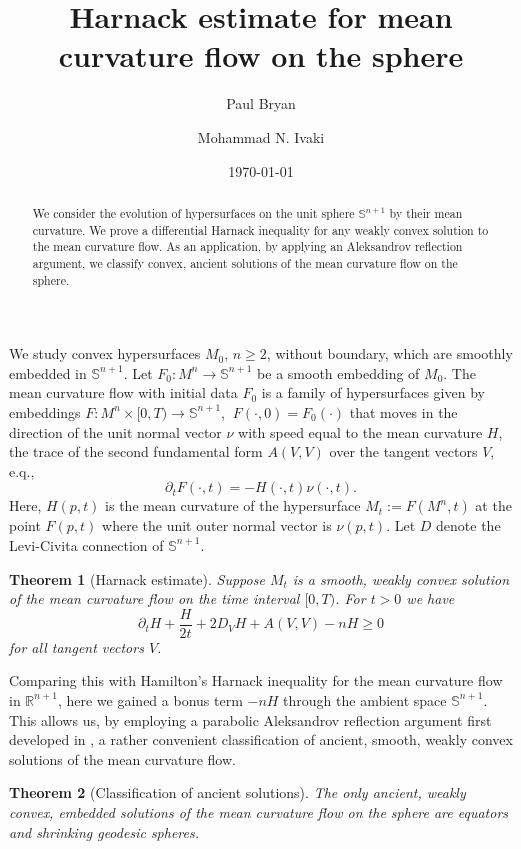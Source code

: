 \documentclass{amsart}
\newtheorem*{thmmain}{Theorem}
\theoremstyle{definition}
\theoremstyle{remark}
\numberwithin{equation}{section}
\begin{document}
\title[Harnack estimate for mean curvature flow on the sphere]
{Harnack estimate for mean curvature flow on the sphere}
\author[P. Bryan]{Paul Bryan}
\address{Department of Mathematics, University of California San Diego, La Jolla, USA}
\curraddr{}
\author[M.N. Ivaki]{Mohammad N. Ivaki}
\address{Institut f\"{u}r Diskrete Mathematik und Geometrie, Technische Universit\"{a}t Wien,
Wiedner Hauptstr. 8--10, 1040 Wien, Austria}
\curraddr{}
\date{\today}

\begin{abstract}
We consider the evolution of hypersurfaces on the unit sphere $\mathbb{S}^{n+1}$ by their mean curvature. We prove a differential Harnack inequality for any weakly convex solution to the mean curvature flow. As an application, by applying an Aleksandrov reflection argument, we classify convex, ancient solutions of the mean curvature flow on the sphere.
\end{abstract}
\maketitle
We study convex hypersurfaces $M_0$, $n\ge2$, without boundary, which are smoothly embedded in $\mathbb{S}^{n+1}.$ Let $F_0:M^n\to \mathbb{S}^{n+1}$ be a smooth embedding of $M_0$. The mean curvature flow with initial data $F_0$ is a family of hypersurfaces given by embeddings $F:M^n\times[0,T)\to \mathbb{S}^{n+1}$, $~ F(\cdot,0)=F_0(\cdot)$ that moves in the direction of the unit normal vector $\nu$ with speed equal to the mean curvature $H$, the trace of the second fundamental form $A(V,V)$ over the tangent vectors $V$, e.q.,
\[\partial_tF(\cdot,t)=-H(\cdot,t)\nu(\cdot,t).\]
Here, $H(p,t)$ is the mean curvature of the hypersurface $M_t:=F(M^n,t)$ at the point $F(p,t)$ where the unit outer normal vector is $\nu(p,t).$
Let $D$ denote the Levi-Civita connection of $\mathbb{S}^{n+1}.$
\begin{thmmain}[Harnack estimate]
Suppose $M_t$ is a smooth, weakly convex solution of the mean curvature flow on the time interval $[0,T)$. For $t>0$ we have
\[\partial_tH+\frac{H}{2t}+2D_VH+A(V,V)-nH\geq 0\]
for all tangent vectors $V$.
\end{thmmain}
Comparing this with Hamilton's Harnack inequality \cite{Hamilton 95} for the mean curvature flow in $\mathbb{R}^{n+1}$, here we gained a bonus term $-nH$ through the ambient space $\mathbb{S}^{n+1}.$ This allows us,
by employing a parabolic Aleksandrov reflection argument first developed in \cite{ Chow 97,Chow-Gul 01, Chow-Gul 96},  a rather convenient classification of ancient, smooth, weakly convex solutions of the mean curvature flow.
\begin{thmmain}[Classification of ancient solutions]
The only ancient, weakly convex, embedded solutions of the mean curvature flow on the sphere are equators and shrinking geodesic spheres.
\end{thmmain}
\end{document}
